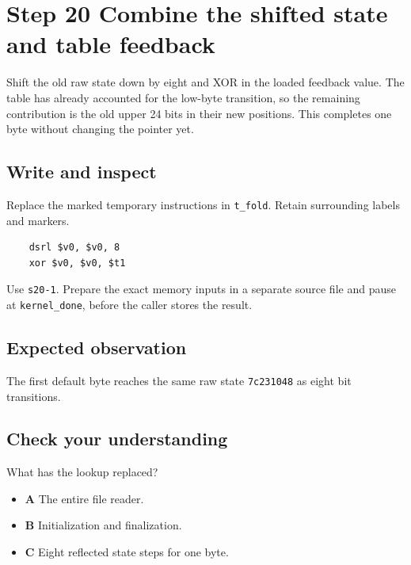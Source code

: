 \section{Step 20 Combine the shifted state and table feedback}\label{crc-s20}

Shift the old raw state down by eight and XOR in the loaded feedback value. The table has already accounted for the low-byte transition, so the remaining contribution is the old upper 24 bits in their new positions. This completes one byte without changing the pointer yet.

\subsection{Write and inspect}
Replace the marked temporary instructions in \texttt{t\_fold}. Retain surrounding labels and markers.

\begin{verbatim}
    dsrl $v0, $v0, 8
    xor $v0, $v0, $t1
\end{verbatim}

Use \texttt{s20-1}. Prepare the exact memory inputs in a separate source file and pause at \texttt{kernel\_done}, before the caller stores the result.

\subsection{Expected observation}
The first default byte reaches the same raw state \texttt{7c231048} as eight bit transitions.

\subsection{Check your understanding}
What has the lookup replaced?

\begin{itemize}
  \item \textbf{A} The entire file reader.
  \item \textbf{B} Initialization and finalization.
  \item \textbf{C} Eight reflected state steps for one byte.
\end{itemize}
